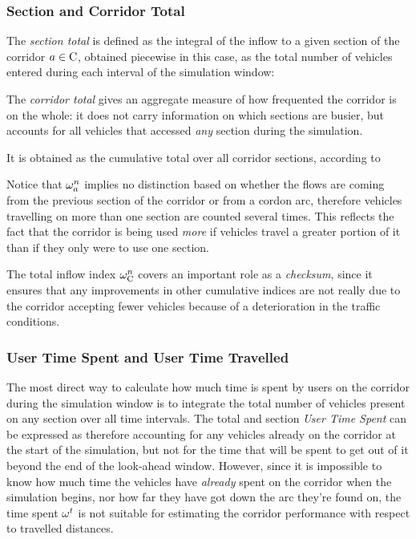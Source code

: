 \subsubsection*{Section and Corridor Total}
The \emph{section total} is defined as the integral of the inflow to a given section of the corridor $a \in \mathrm{C}$, obtained piecewise in this case, as the total number of vehicles entered during each interval of the simulation window:

The \emph{corridor total} gives an aggregate measure of how frequented the corridor is on the whole: it does not carry information on which sections are busier, but accounts for all vehicles that accessed \emph{any} section during the simulation.

It is obtained as the cumulative total over all corridor sections, according to

Notice that $\omega_{a}^{n}$ implies no distinction based on whether the flows are coming from the previous section of the corridor or from a cordon arc, therefore vehicles travelling on more than one section are counted several times. 
This reflects the fact that the corridor is being used \emph{more} if vehicles travel a greater portion of it than if they only were to use one section.

The total inflow index $\omega_{\mathrm{C}}^{n}$ covers an important role as a \emph{checksum}, since it ensures that any improvements in other cumulative indices are not really due to the corridor accepting fewer vehicles because of a deterioration in the traffic conditions.

\subsubsection*{User Time Spent and User Time Travelled}
The most direct way to calculate how much time is spent by users on the corridor during the simulation window is to integrate the total number of vehicles present on any section over all time intervals. The total and section \emph{User Time Spent} can be expressed as
therefore accounting for any vehicles already on the corridor at the start of the simulation, but not for the time that will be spent to get out of it beyond the end of the look-ahead window.
However, since it is impossible to know how much time the vehicles have \emph{already} spent on the corridor when the simulation begins, nor how far they have got down the arc they're found on, the time spent $\omega_{}^{t}$ is not suitable for estimating the corridor performance with respect to travelled distances. 

